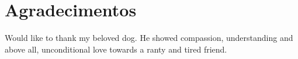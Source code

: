 
\chapter*{Agradecimentos}

Would like to thank my beloved dog. He showed compassion, understanding and above all, unconditional love towards a ranty and tired friend.

\vspace{10mm}
